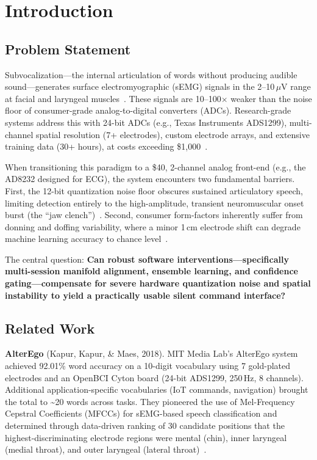 \documentclass[11pt, a4paper]{article}
\begin{document}
\section{Introduction}

\subsection{Problem Statement}

Subvocalization---the internal articulation of words without producing audible sound---generates surface electromyographic (sEMG) signals in the 2--10\,$\mu$V range at facial and laryngeal muscles~\cite{jou2006}. These signals are 10--100$\times$ weaker than the noise floor of consumer-grade analog-to-digital converters (ADCs). Research-grade systems address this with 24-bit ADCs (e.g., Texas Instruments ADS1299), multi-channel spatial resolution (7+ electrodes), custom electrode arrays, and extensive training data (30+ hours), at costs exceeding \$1{,}000~\cite{kapur2018}.

When transitioning this paradigm to a \$40, 2-channel analog front-end (e.g., the AD8232 designed for ECG), the system encounters two fundamental barriers. First, the 12-bit quantization noise floor obscures sustained articulatory speech, limiting detection entirely to the high-amplitude, transient neuromuscular onset burst (the ``jaw clench'')~\cite{nieto2022}. Second, consumer form-factors inherently suffer from donning and doffing variability, where a minor 1\,cm electrode shift can degrade machine learning accuracy to chance level~\cite{meltzner2017}.

The central question: \textbf{Can robust software interventions---specifically multi-session manifold alignment, ensemble learning, and confidence gating---compensate for severe hardware quantization noise and spatial instability to yield a practically usable silent command interface?}

\subsection{Related Work}

\textbf{AlterEgo} (Kapur, Kapur, \& Maes, 2018). MIT Media Lab's AlterEgo system achieved 92.01\% word accuracy on a 10-digit vocabulary using 7 gold-plated electrodes and an OpenBCI Cyton board (24-bit ADS1299, 250\,Hz, 8 channels). Additional application-specific vocabularies (IoT commands, navigation) brought the total to \textasciitilde20 words across tasks. They pioneered the use of Mel-Frequency Cepstral Coefficients (MFCCs) for sEMG-based speech classification and determined through data-driven ranking of 30 candidate positions that the highest-discriminating electrode regions were mental (chin), inner laryngeal (medial throat), and outer laryngeal (lateral throat)~\cite{kapur2018}.
\end{document}
